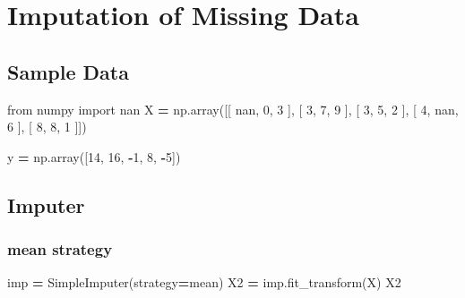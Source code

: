 \documentclass[
]{book}
\newenvironment{Shaded}{\begin{snugshade}}{\end{snugshade}}
\newcommand{\DecValTok}[1]{\textcolor[rgb]{0.06,0.06,0.06}{#1}}
\newcommand{\ImportTok}[1]{#1}
\newcommand{\NormalTok}[1]{#1}
\newcommand{\OperatorTok}[1]{\textcolor[rgb]{0.43,0.43,0.43}{\textbf{#1}}}
\newcommand{\StringTok}[1]{\textcolor[rgb]{0.5,0.5,0.5}{#1}}
\begin{document}
\hypertarget{imputation-of-missing-data}{%
\section{Imputation of Missing Data}\label{imputation-of-missing-data}}

\hypertarget{sample-data-23}{%
\subsection{Sample Data}\label{sample-data-23}}

\begin{Shaded}
\begin{Highlighting}[]
\ImportTok{from}\NormalTok{ numpy }\ImportTok{import}\NormalTok{ nan}
\NormalTok{X }\OperatorTok{=}\NormalTok{ np.array([[ nan, }\DecValTok{0}\NormalTok{,   }\DecValTok{3}\NormalTok{  ],}
\NormalTok{              [ }\DecValTok{3}\NormalTok{,   }\DecValTok{7}\NormalTok{,   }\DecValTok{9}\NormalTok{  ],}
\NormalTok{              [ }\DecValTok{3}\NormalTok{,   }\DecValTok{5}\NormalTok{,   }\DecValTok{2}\NormalTok{  ],}
\NormalTok{              [ }\DecValTok{4}\NormalTok{,   nan, }\DecValTok{6}\NormalTok{  ],}
\NormalTok{              [ }\DecValTok{8}\NormalTok{,   }\DecValTok{8}\NormalTok{,   }\DecValTok{1}\NormalTok{  ]])}

\NormalTok{y }\OperatorTok{=}\NormalTok{ np.array([}\DecValTok{14}\NormalTok{, }\DecValTok{16}\NormalTok{, }\OperatorTok{{-}}\DecValTok{1}\NormalTok{,  }\DecValTok{8}\NormalTok{, }\OperatorTok{{-}}\DecValTok{5}\NormalTok{])}
\end{Highlighting}
\end{Shaded}

\hypertarget{imputer}{%
\subsection{Imputer}\label{imputer}}

\hypertarget{mean-strategy}{%
\subsubsection{mean strategy}\label{mean-strategy}}

\begin{Shaded}
\begin{Highlighting}[]
\NormalTok{imp }\OperatorTok{=}\NormalTok{ SimpleImputer(strategy}\OperatorTok{=}\StringTok{\textquotesingle{}mean\textquotesingle{}}\NormalTok{)}
\NormalTok{X2 }\OperatorTok{=}\NormalTok{ imp.fit\_transform(X)}
\NormalTok{X2}
\end{Highlighting}
\end{Shaded}
\end{document}
